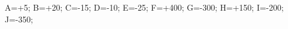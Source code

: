 \documentclass[exercice]{thedocument}%
\begin{document}
%
\>A=+5;%
\>B=+20;%
\>C=-15;%
\>D=-10;%
\>E=-25;%
\>F=+400;%
\>G=-300;%
\>H=+150;%
\>I=-200;%
\>J=-350;%
%
\end{document}
